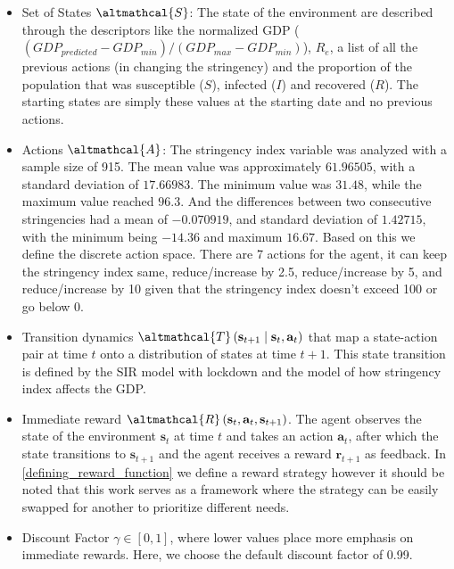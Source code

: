 \documentclass[tikz,fleqn,12pt]{wlscirep}
\begin{document}
\begin{itemize}
    \item Set of States $\altmathcal{S}$: The state of the environment are described through the descriptors like the normalized GDP ($(GDP_{predicted} - GDP_{min}) / (GDP_{max} - GDP_{min})$), $R_e$, a list of all the previous actions (in changing the stringency) and the proportion of the population that was susceptible ($S$), infected ($I$) and recovered ($R$). The starting states are simply these values at the starting date and no previous actions.
    \item Actions $\altmathcal{A}$: The stringency index variable was analyzed with a sample size of 915. The mean value was approximately $61.96505$, with a standard deviation of $17.66983$. The minimum value was $31.48$, while the maximum value reached $96.3$. And the differences between two consecutive stringencies had a mean of $-0.070919$, and standard deviation of $1.42715$, with the minimum being $-14.36$ and maximum $16.67$. Based on this we define the discrete action space. There are 7 actions for the agent, it can keep the stringency index same, reduce/increase by 2.5, reduce/increase by 5, and reduce/increase by 10 given that the stringency index doesn't exceed 100 or go below 0.
    \item Transition dynamics $\altmathcal{T}\left(\mathbf{s}_{t+1} \mid \mathbf{s}_t, \mathbf{a}_t\right)$ that map a state-action pair at time $t$ onto a distribution of states at time $t+1$. This state transition is defined by the SIR model with lockdown and the model of how stringency index affects the GDP.
    \item Immediate reward $\altmathcal{R}\left(\mathbf{s}_t, \mathbf{a}_t, \mathbf{s}_{t+1}\right)$. The agent observes the state of the environment $\mathbf{s}_t$ at time $t$ and takes an action $\mathbf{a}_t$, after which the state transitions to $\mathbf{s}_{t+1}$ and the agent receives a reward $\mathbf{r}_{t+1}$ as feedback. In \cref{defining_reward_function} we define a reward strategy however it should be noted that this work serves as a framework where the strategy can be easily swapped for another to prioritize different needs.
    \item Discount Factor $\gamma \in[0,1]$, where lower values place more emphasis on immediate rewards. Here, we choose the default discount factor of 0.99.
\end{itemize}
\end{document}
